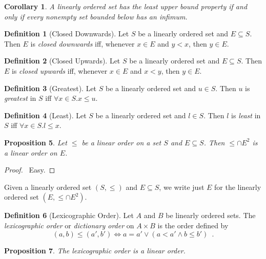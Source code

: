 \documentclass{book}
\let\qed\relax
\newtheorem{prop}{Proposition}[chapter]
\newtheorem{cor}{Corollary}[prop]
\theoremstyle{definition}
\newtheorem{df}[prop]{Definition}
\begin{document}
\begin{cor}
A linearly ordered set has the least upper bound property if and only if every nonempty set bounded below has an infimum.
\end{cor}

\begin{df}[Closed Downwards]
Let $S$ be a linearly ordered set and $E \subseteq S$. Then $E$ is \emph{closed downwards} iff, whenever $x \in E$ and $y < x$, then $y \in E$.
\end{df}

\begin{df}[Closed Upwards]
Let $S$ be a linearly ordered set and $E \subseteq S$. Then $E$ is \emph{closed upwards} iff, whenever $x \in E$ and $x < y$, then $y \in E$.
\end{df}

\begin{df}[Greatest]
Let $S$ be a linearly ordered set and $u \in S$. Then $u$ is \emph{greatest} in $S$ iff $\forall x \in S. x \leq u$.
\end{df}

\begin{df}[Least]
Let $S$ be a linearly ordered set and $l \in S$. Then $l$ is \emph{least} in $S$ iff $\forall x \in S. l \leq x$.
\end{df}

\begin{prop}
Let $\leq$ be a linear order on a set $S$ and $E \subseteq S$. Then $\leq \cap E^2$ is a linear order on $E$.
\end{prop}

\begin{proof}
\pf\ Easy. \qed
\end{proof}

Given a linearly ordered set $(S, \leq)$ and $E \subseteq S$, we write just $E$ for the linearly ordered set $(E, \leq \cap E^2)$.

\begin{df}[Lexicographic Order]
Let $A$ and $B$ be linearly ordered sets. The \emph{lexicographic order} or \emph{dictionary order} on $A \times B$ is the order defined by
\[ (a,b) \leq (a',b') \Leftrightarrow a = a' \vee (a < a' \wedge b \leq b') \enspace . \]
\end{df}

\begin{prop}
The lexicographic order is a linear order.
\end{prop}

\end{document}
